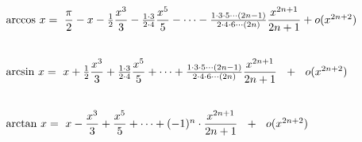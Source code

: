 \begin{frame}

$$\hspace*{-2em}
\begin{array}{l}
\text{arccos } x =\  
\dfrac{\pi}{2} - x - \frac{1}{2}\dfrac{x^3}{3} - \frac{1\cdot3}{2\cdot4}\dfrac{x^5}{5}- \cdots -
\frac{1\cdot3\cdot5\cdots(2n-1)}{2\cdot4\cdot6\cdots(2n)} \dfrac{x^{2n+1}}{2n+1} +  o(x^{2n+2})
\\[1cm]
\text{arcsin } x =\  x + \frac{1}{2}\dfrac{x^3}{3} + \frac{1\cdot3}{2\cdot4}\dfrac{x^5}{5}+ \cdots +
\frac{1\cdot3\cdot5\cdots(2n-1)}{2\cdot4\cdot6\cdots(2n)} \dfrac{x^{2n+1}}{2n+1}\ \ + \ \ o(x^{2n+2})
\\[1cm]
\text{arctan } x =\   x - \dfrac{x^3}{3}+\dfrac{x^5}{5}+ \cdots + (-1)^{n}\cdot\dfrac{x^{2n+1}}{2n+1}\ \  + \ \ o(x^{2n+2}) 
\end{array}
$$
\end{frame}



